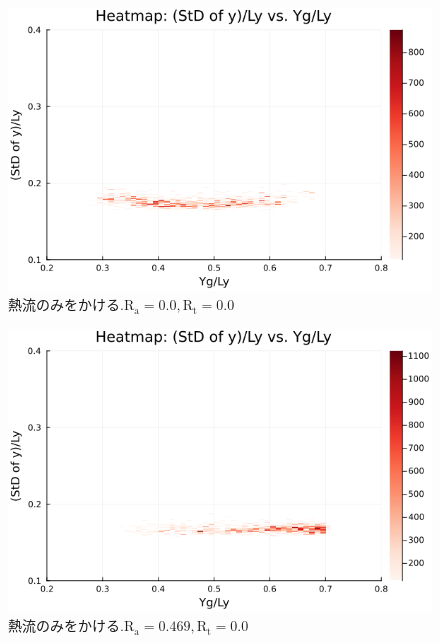 
\begin{figure}[H]
  \centering
  \includegraphics[scale=0.6]{image/g0_heat/2024-01-15T14:07:33.905_mapg0_chiinf_Ay50_rho0.4_T0.43_dT0.04_Rd0.0_Rt0.0_Ra0.0_g0_run4.0e7.png}
  \caption{$熱流のみをかける. \text{R}_\text{a}=0.0,\text{R}_\text{t}=0.0$} 
  \label{}
\end{figure}

\begin{figure}[H]
  \centering
  \includegraphics[scale=0.6]{image/g0_heat/2024-01-15T14:07:34.556_mapg0_chiinf_Ay50_rho0.4_T0.43_dT0.04_Rd0.0_Rt0.0_Ra0.4693845_g0_run4.0e7.png}
  \caption{$熱流のみをかける. \text{R}_\text{a}=0.469,\text{R}_\text{t}=0.0$}
  \label{}
\end{figure}

